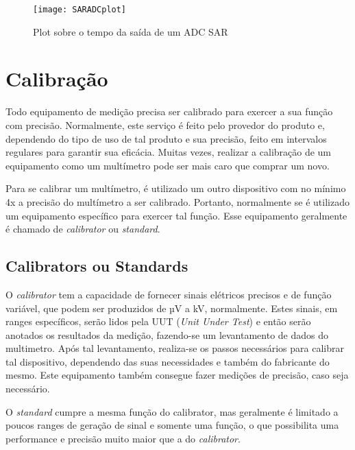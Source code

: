     \begin{figure}[htb]%
        \caption{Plot sobre o tempo da saída de um ADC SAR}%
        \label{fig:SARADCplot}%
        \texttt{[image: SARADCplot]}%
    \end{figure} 


\section{Calibração}\label{sec:Calibration}

Todo equipamento de medição precisa ser calibrado para exercer a sua função com precisão. Normalmente, este serviço é feito pelo provedor do produto e, dependendo do tipo de uso de tal produto e sua precisão, feito em intervalos regulares para garantir sua eficácia. Muitas vezes, realizar a calibração de um equipamento como um multímetro pode ser mais caro que comprar um novo.

Para se calibrar um multímetro, é utilizado um outro dispositivo com no mínimo 4x a precisão do multímetro a ser calibrado. Portanto, normalmente se é utilizado um equipamento específico para exercer tal função. Esse equipamento geralmente é chamado de \textit{calibrator} ou \textit{standard}. %

    \subsection{Calibrators ou Standards}\label{subsec:Calibrators}

    O \textit{calibrator} tem a capacidade de fornecer sinais elétricos precisos e de função variável, que podem ser produzidos de µV a kV, normalmente. Estes sinais, em ranges específicos, serão lidos pela \gls{UUT} (\textit{Unit Under Test}) e então serão anotados os resultados da medição, fazendo-se um levantamento de dados do multimetro. Após tal levantamento, realiza-se os passos necessários para calibrar tal dispositivo, dependendo das suas necessidades e também do fabricante do mesmo. Este equipamento também consegue fazer medições de precisão, caso seja necessário. 

    O \textit{standard} cumpre a mesma função do calibrator, mas geralmente é limitado a poucos ranges de geração de sinal e somente uma função, o que possibilita uma performance e precisão muito maior que a do \textit{calibrator}. 

